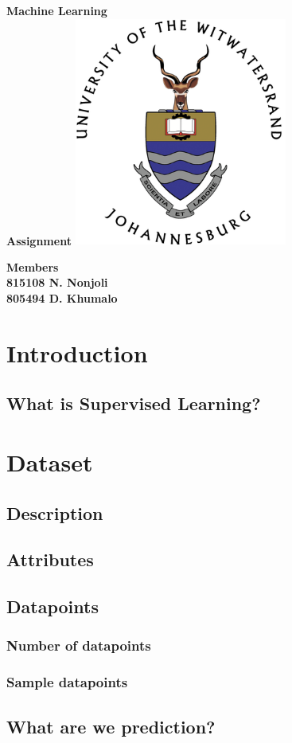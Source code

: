 \documentclass{article}
\begin{document}
	
	\begin{titlepage}
		
		\centering
		
		{\bfseries\LARGE
			Machine Learning\\
			Assignment
		}
		\vfill
		\includegraphics[width=7cm]{img/logo.png}
		\vfill
		\begin{center}
			{\bfseries\LARGE Members}\\
			{\bfseries\large
				815108 N. Nonjoli\\
				805494 D. Khumalo
			}
		\end{center}
		\vfill
		\thispagestyle{empty}
	\end{titlepage}

	\tableofcontents
	\thispagestyle{empty}
	\newpage
	
	\section{Introduction}
	\setcounter{page}{1}
	\subsection{What is Supervised Learning?}
	
	\newpage
	
	\section{Dataset}
	\subsection{Description}
	\subsection{Attributes}
	\subsection{Datapoints}
	\subsubsection{Number of datapoints}
	\subsubsection{Sample datapoints}
	\subsection{What are we prediction?}
	\newpage
	
\end{document}
